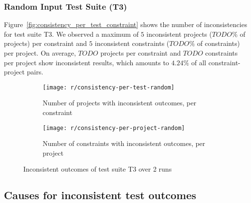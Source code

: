 \subsubsection{Random Input Test Suite (T3)}

Figure~\ref{fig:consistency_per_test_constraint} shows the number of inconsistencies for test suite T3.
We observed a maximum of $5$ inconsistent projects ($TODO\%$ of projects) per constraint and $5$ inconsistent constraints ($TODO\%$ of constraints) per project.
On average, $TODO$ projects per constraint and $TODO$ constraints per project show inconsistent results,
which amounts to $4.24\%$ of all constraint-project pairs.
\parspace

\begin{figure}[htpb]
    \centering
    \begin{subfigure}{.475\textwidth}
        \texttt{[image: r/consistency-per-test-random]}%
        \vspace{-\medskipamount}
        \caption{Number of projects with inconsistent outcomes, per constraint}
        \label{fig:consistency_per_test_random}
    \end{subfigure}
    \begin{subfigure}{.475\textwidth}
        \texttt{[image: r/consistency-per-project-random]}%
        \vspace{-\medskipamount}
        \caption{Number of constraints with inconsistent outcomes, per project}
        \label{fig:consistency_per_project_random}
    \end{subfigure}

    \caption{Inconsistent outcomes of test suite T3 over 2 runs}
    \label{fig:consistency_random}
\end{figure}

\subsection{Causes for inconsistent test outcomes}

